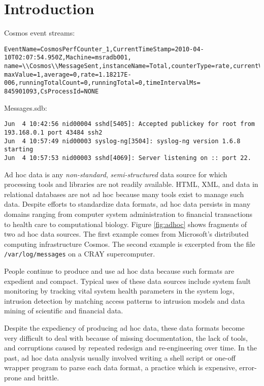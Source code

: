 \section{Introduction}

\begin{figure*}
Cosmos event streams:
{\footnotesize
\begin{verbatim}
EventName=CosmosPerfCounter_1,CurrentTimeStamp=2010-04-10T02:07:54.950Z,Machine=msradb001,
name=\\Cosmos\\MessageSent,instanceName=Total,counterType=rate,currentValue=1,minValue=1,
maxValue=1,average=0,rate=1.18217E-006,runningTotalCount=0,runningTotal=0,timeIntervalMs=
845901093,CsProcessId=NONE
\end{verbatim}
}
Messages.sdb:
{\footnotesize
\begin{verbatim}
Jun  4 10:42:56 nid00004 sshd[5405]: Accepted publickey for root from 193.168.0.1 port 43484 ssh2
Jun  4 10:57:49 nid00003 syslog-ng[3504]: syslog-ng version 1.6.8 starting
Jun  4 10:57:53 nid00003 sshd[4069]: Server listening on :: port 22.
\end{verbatim}
}
\caption{Example ad hoc data sources}\label{fig:adhoc}
\end{figure*}


Ad hoc data is any {\em non-standard}, {\em semi-structured} 
data source for which processing tools and libraries are not
readily available. HTML, XML, and data in relational databases are not ad hoc because 
many tools exist to manage such data.
Despite efforts to standardize data formats, ad hoc data persists
in many domains ranging from computer system administration to 
financial transactions
 to health care to computational biology. Figure 
\ref{fig:adhoc} shows fragments of two ad hoc data sources.
The first example comes from Microsoft's distributed computing
infrastructure Cosmos. The second example is excerpted from the file 
\texttt{/var/log/messages}
on a CRAY supercomputer.

People continue to produce and use ad hoc data because such formats 
are expedient and compact.  
Typical uses of these data sources include system fault monitoring
by tracking vital system health parameters in the system logs,
intrusion detection by matching access patterns to intrusion
models and data mining of scientific and financial data.

Despite the expediency of producing ad hoc data, these
data formats become very difficult to deal with because of missing
documentation, the lack of tools, and corruptions caused by
repeated redesign and re-engineering over time. 
In the past, ad hoc data analysis usually involved
writing a shell script or one-off wrapper program to parse each 
data format, a practice which is expensive, error-prone and brittle.

